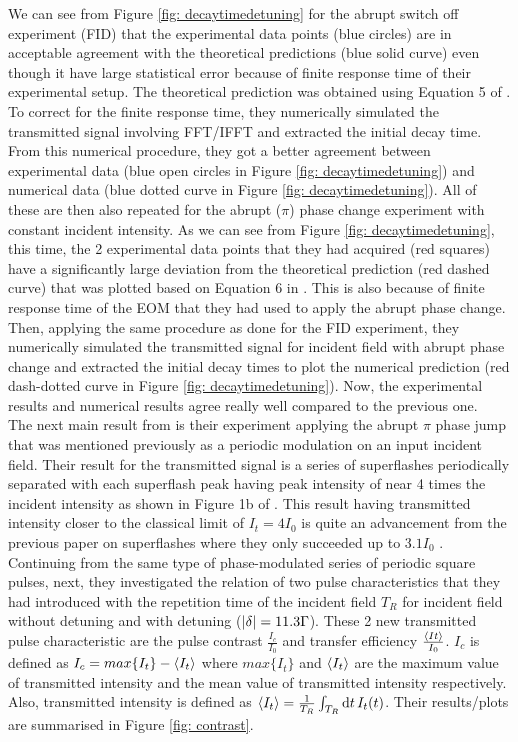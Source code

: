 We can see from Figure \ref{fig: decaytimedetuning} for the abrupt switch off experiment (FID) that the experimental data points (blue circles) are in acceptable agreement with the theoretical predictions (blue solid curve) even though it have large statistical error because of finite response time of their experimental setup. The theoretical prediction was obtained using Equation 5 of \cite{Kwong2015}. To correct for the finite response time, they numerically simulated the transmitted signal involving FFT/IFFT and extracted the initial decay time. From this numerical procedure, they got a better agreement between experimental data (blue open circles in Figure \ref{fig: decaytimedetuning}) and numerical data (blue dotted curve in Figure \ref{fig: decaytimedetuning}). All of these are then also repeated for the abrupt ($\pi$) phase change experiment with constant incident intensity. As we can see from Figure \ref{fig: decaytimedetuning}, this time, the 2 experimental data points that they had acquired (red squares) have a significantly large deviation from the theoretical prediction (red dashed curve) that was plotted based on Equation 6 in \cite{Kwong2015}. This is also because of finite response time of the EOM that they had used to apply the abrupt phase change. Then, applying the same procedure as done for the FID experiment, they numerically simulated the transmitted signal for incident field with abrupt phase change and extracted the initial decay times to plot the numerical prediction (red dash-dotted curve in Figure \ref{fig: decaytimedetuning}). Now, the experimental results and numerical results agree really well compared to the previous one.\\

The next main result from \cite{Kwong2015} is their experiment applying the abrupt $\pi$ phase jump that was mentioned previously as a periodic modulation on an input incident field. Their result for the transmitted signal is a series of superflashes periodically separated with each superflash peak having peak intensity of near 4 times the incident intensity as shown in Figure 1b of \cite{Kwong2015}. This result having transmitted intensity closer to the classical limit of $I_{t} = 4 I_{0}$ is quite an advancement from the previous paper on superflashes where they only succeeded up to $3.1 I_{0}$ \cite{Kwong2014}.\\

Continuing from the same type of phase-modulated series of periodic square pulses, next, they investigated the relation of two pulse characteristics that they had introduced with the repetition time of the incident field $T_{R}$ for incident field without detuning and with detuning ($\abs{\delta} = 11.3 \Gamma$). These 2 new transmitted pulse characteristic are the pulse contrast $\frac{I_{c}}{I_{0}}$ and transfer efficiency $\frac{\expval{I_{}t}}{I_{0}}$. $I_{c}$ is defined as $I_{c} = max\{I_{t}\} - \expval{I_{t}}$ where $max\{I_{t}\}$ and $\expval{I_{t}}$ are the maximum value of transmitted intensity and the mean value of transmitted intensity respectively. Also, transmitted intensity is defined as $\expval{I_{t}} = \frac{1}{T_{R}} \int_{T_{R}} \dd{t} I_{t}(t)$. Their results/plots are summarised in Figure \ref{fig: contrast}.


